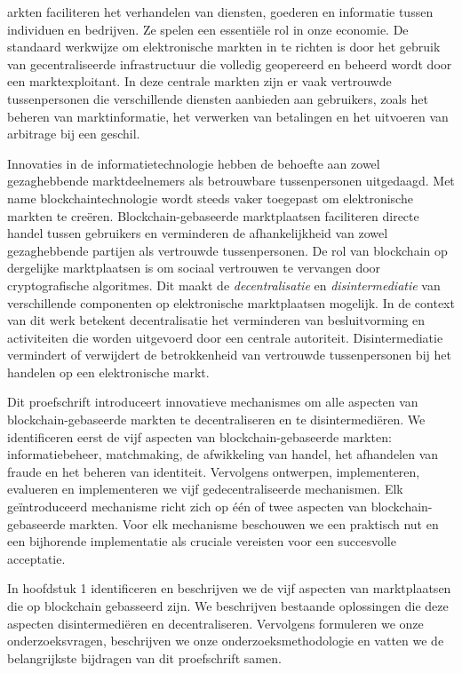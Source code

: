 {

arkten faciliteren het verhandelen van diensten, goederen en informatie tussen individuen en bedrijven.
Ze spelen een essentiële rol in onze economie.
De standaard werkwijze om elektronische markten in te richten is door het gebruik van gecentraliseerde infrastructuur die volledig geopereerd en beheerd wordt door een marktexploitant.
In deze centrale markten zijn er vaak vertrouwde tussenpersonen die verschillende diensten aanbieden aan gebruikers, zoals het beheren van marktinformatie, het verwerken van betalingen en het uitvoeren van arbitrage bij een geschil.

Innovaties in de informatietechnologie hebben de behoefte aan zowel gezaghebbende marktdeelnemers als betrouwbare tussenpersonen uitgedaagd.
Met name blockchaintechnologie wordt steeds vaker toegepast om elektronische markten te creëren.
Blockchain-gebaseerde marktplaatsen faciliteren directe handel tussen gebruikers en verminderen de afhankelijkheid van zowel gezaghebbende partijen als vertrouwde tussenpersonen.
De rol van blockchain op dergelijke marktplaatsen is om sociaal vertrouwen te vervangen door cryptografische algoritmes.
Dit maakt de \emph{decentralisatie} en \emph{disintermediatie} van verschillende componenten op elektronische marktplaatsen mogelijk.
In de context van dit werk betekent decentralisatie het verminderen van besluitvorming en activiteiten die worden uitgevoerd door een centrale autoriteit.
Disintermediatie vermindert of verwijdert de betrokkenheid van vertrouwde tussenpersonen bij het handelen op een elektronische markt.

Dit proefschrift introduceert innovatieve mechanismes om alle aspecten van blockchain-gebaseerde markten te decentraliseren en te disintermediëren.
We identificeren eerst de vijf aspecten van blockchain-gebaseerde markten: informatiebeheer, matchmaking, de afwikkeling van handel, het afhandelen van fraude en het beheren van identiteit.
Vervolgens ontwerpen, implementeren, evalueren en implementeren we vijf gedecentraliseerde mechanismen.
Elk geïntroduceerd mechanisme richt zich op één of twee aspecten van blockchain-gebaseerde markten.
Voor elk mechanisme beschouwen we een praktisch nut en een bijhorende implementatie als cruciale vereisten voor een succesvolle acceptatie.

In hoofdstuk 1 identificeren en beschrijven we de vijf aspecten van marktplaatsen die op blockchain gebasseerd zijn.
We beschrijven bestaande oplossingen die deze aspecten disintermediëren en decentraliseren.
Vervolgens formuleren we onze onderzoeksvragen, beschrijven we onze onderzoeksmethodologie en vatten we de belangrijkste bijdragen van dit proefschrift samen.

}

